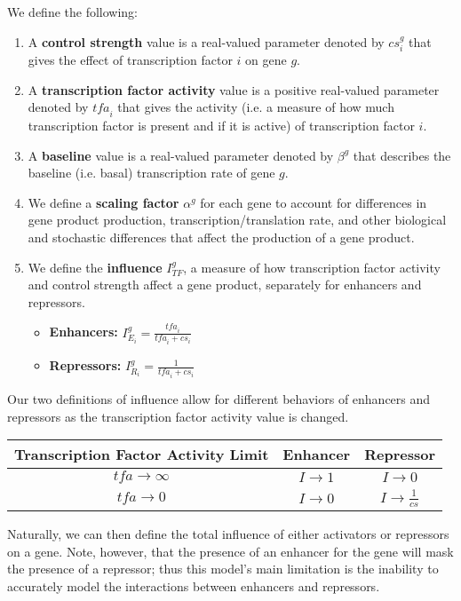 \documentclass[paper=a4, fontsize=11pt]{scrartcl} %
\newcommand{\tfa}{\textit{tfa}}
\newcommand{\cs}{\textit{cs}}
\begin{document}
We define the following:
\begin{enumerate}
\item A \textbf{control strength} value is a real-valued parameter denoted by $\cs_i^g$ that gives the effect of transcription factor $i$ on gene $g$.
\item A \textbf{transcription factor activity} value is a positive real-valued parameter denoted by $\tfa_i$ that gives the activity (i.e. a measure of how much transcription factor is present and if it is active) of transcription factor $i$.
\item A \textbf{baseline} value is a real-valued parameter denoted by $\beta^g$ that describes the baseline (i.e. basal) transcription rate of gene $g$.
\item We define a \textbf{scaling factor} $\alpha^g$ for each gene to account for differences in gene product production, transcription/translation rate, and other biological and stochastic differences that affect the production of a gene product.
\item We define the \textbf{influence} $I_{TF}^g$, a measure of how transcription factor activity and control strength affect a gene product, separately for enhancers and repressors.
	\begin{itemize}
	\item \textbf{Enhancers: }$I_{E_i}^g = \frac{\tfa_i}{\tfa_i + \cs_i}$
	\item \textbf{Repressors: }$I_{R_i}^g = \frac{1}{\tfa_i + \cs_i}$
	\end{itemize}
\end{enumerate}
Our two definitions of influence allow for different behaviors of enhancers and repressors as the transcription factor activity value is changed. 

\begin{center}
\begin{tabular}{c|cc}
Transcription Factor Activity Limit & Enhancer          & Repressor                           \\ \hline
$\textit{tfa} \rightarrow \infty$   & $I \rightarrow 1$ & $I \rightarrow 0$                   \\
$\textit{tfa} \rightarrow 0$        & $I \rightarrow 0$ & $I \rightarrow \frac1{\textit{cs}}$ 
\end{tabular}
\end{center}

Naturally, we can then define the total influence of either activators or repressors on a gene. Note, however, that the presence of an enhancer for the gene will mask the presence of a repressor; thus this model's main limitation is the inability to accurately model the interactions between enhancers and repressors.
\end{document}
